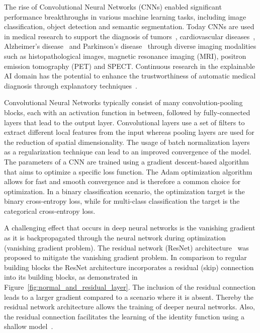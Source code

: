 The rise of Convolutional Neural Networks (CNNs) enabled significant performance breakthroughs 
in various machine learning tasks, including image classification, object detection and semantic segmentation.
Today CNNs are used in medical research to support the diagnosis 
of tumors~\citep{Tiwari2022-wr, Gunashekar2022-rl, Gao2021-zu}, 
cardiovascular diseases~\citep{Yoon2023-ik, Li2022-yn}, 
Alzheimer's disease~\citep{Basaia2019-pg, Folego2020-ak} 
and Parkinson's disease~\citep{Hathaliya2022, Magesh2020, Li2023-ym}
through diverse imaging modalities such as
histopathological images, magnetic resonance imaging (MRI), positron emission tomography (PET) and SPECT.
Continuous research in the explainable AI domain has the potential to enhance the trustworthiness 
of automatic medical diagnosis through explanatory techniques~\citep{Ribeiro2016, Petsiuk2018, Dhurandhar2018, Chaddad2023-zl}.

Convolutional Neural Networks typically consist of many convolution-pooling blocks, 
each with an activation function in between, followed by fully-connected layers that lead to the output layer.
Convolutional layers use a set of filters to extract different local features from the input 
whereas pooling layers are used for the reduction of spatial dimensionality.
The usage of batch normalization layers as a regularization technique can lead to an improved convergence of the model.
The parameters of a CNN are trained using a gradient descent-based algorithm that aims to optimize a specific loss function.
The Adam optimization algorithm~\citep{Diederik2015} allows for fast and smooth convergence 
and is therefore a common choice for optimization.
In a binary classification scenario, the optimization target is the binary cross-entropy loss,
while for multi-class classification the target is the categorical cross-entropy loss.

A challenging effect that occurs in deep neural networks is the vanishing gradient 
as it is backpropagated through the neural network during optimization (vanishing gradient problem).
The residual network (ResNet) architecture~\citep{He2016} was proposed to mitigate the vanishing gradient problem.
In comparison to regular building blocks the ResNet architecture incorporates a residual (skip) connection 
into its building blocks, as demonstrated in Figure~\ref{fig:normal_and_residual_layer}.
The inclusion of the residual connection leads to a larger gradient compared to a scenario where it is absent.
Thereby the residual network architecture allows the training of deeper neural networks.
Also, the residual connection facilitates the learning of the identity function using a shallow model~\citep{He2016}.


